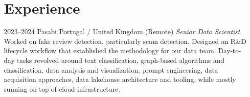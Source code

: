 \documentclass{friggeri-cv}
\begin{document}

\section{Experience}

\begin{entrylist}
\entry
{2023--2024}
{Pasabi}
{Portugal / United Kingdom (Remote)}
{\emph{Senior Data Scientist}\\[-.5em]

Worked on fake review detection, particularly scam detection. Designed an R\&D lifecycle workflow that established the methodology for our data team. Day-to-day tasks revolved around text classification, graph-based algorithms and classification, data analysis and visualization, prompt engineering, data acquisition approaches, data lakehouse architecture and tooling, while mostly running on top of cloud infrastructure.}
\end{entrylist}
\end{document}
